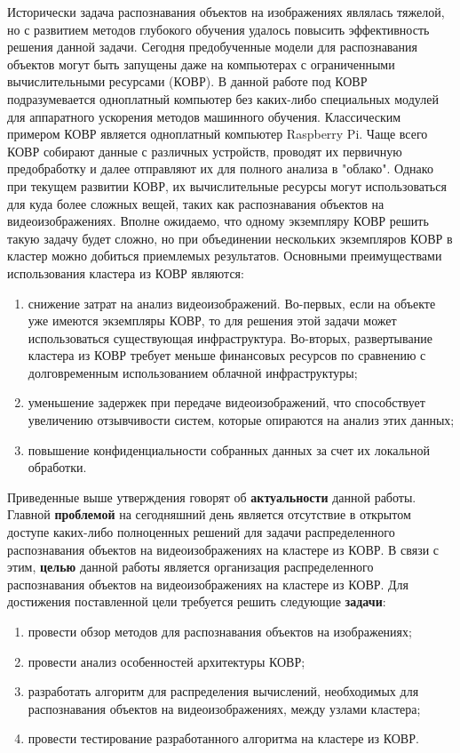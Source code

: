 Исторически задача распознавания объектов на изображениях являлась тяжелой, но с развитием методов глубокого обучения удалось 
повысить эффективность решения данной задачи. Сегодня предобученные модели для распознавания объектов могут быть запущены даже 
на компьютерах с ограниченными вычислительными ресурсами (КОВР). В данной работе под КОВР подразумевается одноплатный компьютер 
без каких-либо специальных модулей для аппаратного ускорения методов машинного обучения. Классическим примером КОВР является одноплатный
компьютер Raspberry Pi. Чаще всего КОВР собирают данные с различных устройств, проводят их первичную предобработку и далее отправляют
их для полного анализа в "облако". Однако при текущем развитии КОВР, их вычислительные ресурсы могут использоваться для куда более
сложных вещей, таких как распознавания объектов на видеоизображениях. Вполне ожидаемо, что одному экземпляру КОВР решить 
такую задачу будет сложно, но при объединении нескольких экземпляров КОВР в кластер можно добиться приемлемых результатов. 
Основными преимуществами использования кластера из КОВР являются:

\begin{enumerate}
\item снижение затрат на анализ видеоизображений. Во-первых, если на объекте уже имеются экземпляры КОВР, 
то для решения этой задачи может использоваться существующая инфраструктура. Во-вторых, развертывание кластера из КОВР
требует меньше финансовых ресурсов по сравнению с долговременным использованием облачной инфраструктуры; 
\item уменьшение задержек при передаче видеоизображений, что способствует увеличению отзывчивости систем, которые 
опираются на анализ этих данных; 
\item повышение конфиденциальности собранных данных за счет их локальной обработки.
\end{enumerate}

Приведенные выше утверждения говорят об \textbf{актуальности} данной работы. Главной \textbf{проблемой} на сегодняшний день 
является отсутствие в открытом доступе каких-либо полноценных решений для задачи распределенного распознавания объектов на 
видеоизображениях на кластере из КОВР. В связи с этим, \textbf{целью} данной работы является организация распределенного 
распознавания объектов на видеоизображениях на кластере из КОВР. Для достижения поставленной цели требуется решить 
следующие \textbf{задачи}:

\begin{enumerate}
\item провести обзор методов для распознавания объектов на изображениях;
\item провести анализ особенностей архитектуры КОВР;
\item разработать алгоритм для распределения вычислений, необходимых для распознавания объектов на видеоизображениях, 
между узлами кластера;
\item провести тестирование разработанного алгоритма на кластере из КОВР.
\end{enumerate}

\clearpage
